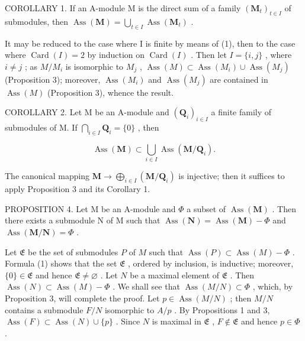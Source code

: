 COROLLARY 1. If an A-module M is the direct sum of a family \((\mathbf{M}_t)_{t \in I}\) of submodules, then \(\operatorname{Ass}(\mathbf{M}) = \bigcup_{t \in I} \operatorname{Ass}(\mathbf{M}_t)\) .

It may be reduced to the case where I is finite by means of (1), then to the case where \(\operatorname{Card}(I) = 2\) by induction on \(\operatorname{Card}(I)\) . Then let \(I = \{i, j\}\) , where \(i \neq j\) ; as \(M/M_{i}\) is isomorphic to \(M_{j}\) , \(\operatorname{Ass}(M) \subset \operatorname{Ass}(M_{i}) \cup \operatorname{Ass}(M_{j})\) (Proposition 3); moreover, \(\operatorname{Ass}(M_{i})\) and \(\operatorname{Ass}(M_{j})\) are contained in \(\operatorname{Ass}(M)\) (Proposition 3), whence the result.

COROLLARY 2. Let M be an A-module and \((\mathbf{Q}_i)_{i\in I}\) a finite family of submodules of M. If \(\bigcap_{i\in I} \mathbf{Q}_i = \{0\}\) , then

\[
\operatorname{Ass} (\mathbf {M}) \subset \bigcup_ {i \in I} \operatorname{Ass} (\mathbf {M} / \mathbf {Q} _ {i}).
\]

The canonical mapping \(\mathbf{M} \to \bigoplus_{i \in I} (\mathbf{M} / \mathbf{Q}_i)\) is injective; then it suffices to apply Proposition 3 and its Corollary 1.

PROPOSITION 4. Let M be an A-module and \(\Phi\) a subset of \(\operatorname{Ass}(\mathbf{M})\) . Then there exists a submodule N of M such that \(\operatorname{Ass}(\mathbf{N}) = \operatorname{Ass}(\mathbf{M}) - \Phi\) and \(\operatorname{Ass}(\mathbf{M}/\mathbf{N}) = \Phi\) .

Let \(\mathfrak{E}\) be the set of submodules \(P\) of \(M\) such that \(\operatorname{Ass}(P) \subset \operatorname{Ass}(M) - \Phi\) . Formula (1) shows that the set \(\mathfrak{E}\) , ordered by inclusion, is inductive; moreover, \(\{0\} \in \mathfrak{E}\) and hence \(\mathfrak{E} \neq \varnothing\) . Let \(N\) be a maximal element of \(\mathfrak{E}\) . Then \(\operatorname{Ass}(N) \subset \operatorname{Ass}(M) - \Phi\) . We shall see that \(\operatorname{Ass}(M/N) \subset \Phi\) , which, by Proposition 3, will complete the proof. Let \(p \in \operatorname{Ass}(M/N)\) ; then \(M/N\) contains a submodule \(F/N\) isomorphic to \(A/p\) . By Propositions 1 and 3, \(\operatorname{Ass}(F) \subset \operatorname{Ass}(N) \cup \{p\}\) . Since \(N\) is maximal in \(\mathfrak{E}\) , \(F \notin \mathfrak{E}\) and hence \(p \in \Phi\) .

